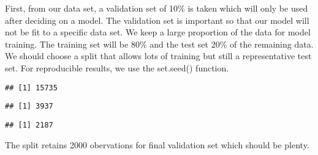 \documentclass[
]{article}
\newenvironment{Shaded}{\begin{snugshade}}{\end{snugshade}}
\newcommand{\CommentTok}[1]{\textcolor[rgb]{0.56,0.35,0.01}{\textit{#1}}}
\newcommand{\DataTypeTok}[1]{\textcolor[rgb]{0.13,0.29,0.53}{#1}}
\newcommand{\DecValTok}[1]{\textcolor[rgb]{0.00,0.00,0.81}{#1}}
\newcommand{\FloatTok}[1]{\textcolor[rgb]{0.00,0.00,0.81}{#1}}
\newcommand{\KeywordTok}[1]{\textcolor[rgb]{0.13,0.29,0.53}{\textbf{#1}}}
\newcommand{\NormalTok}[1]{#1}
\newcommand{\OperatorTok}[1]{\textcolor[rgb]{0.81,0.36,0.00}{\textbf{#1}}}
\newcommand{\StringTok}[1]{\textcolor[rgb]{0.31,0.60,0.02}{#1}}
\begin{document}
First, from our data set, a validation set of 10\% is taken which will
only be used after deciding on a model. The validation set is important
so that our model will not be fit to a specific data set. We keep a
large proportion of the data for model training. The training set will
be 80\% and the test set 20\% of the remaining data. We should choose a
split that allows lots of training but still a representative test set.
For reproducible results, we use the set.seed() function.

\begin{Shaded}
\end{Shaded}

\begin{verbatim}
## [1] 15735
\end{verbatim}

\begin{verbatim}
## [1] 3937
\end{verbatim}

\begin{verbatim}
## [1] 2187
\end{verbatim}

The split retains 2000 obervations for final validation set which should
be plenty.
\end{document}
